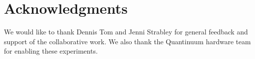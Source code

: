 \documentclass[10pt, twocolumn, aps, nofootinbib, longbibliography, nobibnotes, superscriptaddress]{revtex4-1} %
\begin{document}


\section*{Acknowledgments}

We would like to thank Dennis Tom and Jenni Strabley for general feedback and support of the collaborative work.  
We also thank the Quantinuum hardware team for enabling these experiments.  


\ifx\compilefullpaper\undefined  


\end{document}
